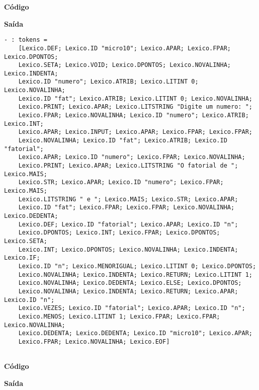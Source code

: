 \documentclass[hidelinks,12pt]{article}
\begin{document}
	
	{\large \textbf{Código} }
			
	
	{\large \textbf{Saída}}
	
	\begin{lstlisting}[caption=Analisador Léxico]
	- : tokens =
	[Lexico.DEF; Lexico.ID "micro10"; Lexico.APAR; Lexico.FPAR; Lexico.DPONTOS;
	Lexico.SETA; Lexico.VOID; Lexico.DPONTOS; Lexico.NOVALINHA; Lexico.INDENTA;
	Lexico.ID "numero"; Lexico.ATRIB; Lexico.LITINT 0; Lexico.NOVALINHA;
	Lexico.ID "fat"; Lexico.ATRIB; Lexico.LITINT 0; Lexico.NOVALINHA;
	Lexico.PRINT; Lexico.APAR; Lexico.LITSTRING "Digite um numero: ";
	Lexico.FPAR; Lexico.NOVALINHA; Lexico.ID "numero"; Lexico.ATRIB; Lexico.INT;
	Lexico.APAR; Lexico.INPUT; Lexico.APAR; Lexico.FPAR; Lexico.FPAR;
	Lexico.NOVALINHA; Lexico.ID "fat"; Lexico.ATRIB; Lexico.ID "fatorial";
	Lexico.APAR; Lexico.ID "numero"; Lexico.FPAR; Lexico.NOVALINHA;
	Lexico.PRINT; Lexico.APAR; Lexico.LITSTRING "O fatorial de "; Lexico.MAIS;
	Lexico.STR; Lexico.APAR; Lexico.ID "numero"; Lexico.FPAR; Lexico.MAIS;
	Lexico.LITSTRING " e "; Lexico.MAIS; Lexico.STR; Lexico.APAR;
	Lexico.ID "fat"; Lexico.FPAR; Lexico.FPAR; Lexico.NOVALINHA; Lexico.DEDENTA;
	Lexico.DEF; Lexico.ID "fatorial"; Lexico.APAR; Lexico.ID "n";
	Lexico.DPONTOS; Lexico.INT; Lexico.FPAR; Lexico.DPONTOS; Lexico.SETA;
	Lexico.INT; Lexico.DPONTOS; Lexico.NOVALINHA; Lexico.INDENTA; Lexico.IF;
	Lexico.ID "n"; Lexico.MENORIGUAL; Lexico.LITINT 0; Lexico.DPONTOS;
	Lexico.NOVALINHA; Lexico.INDENTA; Lexico.RETURN; Lexico.LITINT 1;
	Lexico.NOVALINHA; Lexico.DEDENTA; Lexico.ELSE; Lexico.DPONTOS;
	Lexico.NOVALINHA; Lexico.INDENTA; Lexico.RETURN; Lexico.APAR; Lexico.ID "n";
	Lexico.VEZES; Lexico.ID "fatorial"; Lexico.APAR; Lexico.ID "n";
	Lexico.MENOS; Lexico.LITINT 1; Lexico.FPAR; Lexico.FPAR; Lexico.NOVALINHA;
	Lexico.DEDENTA; Lexico.DEDENTA; Lexico.ID "micro10"; Lexico.APAR;
	Lexico.FPAR; Lexico.NOVALINHA; Lexico.EOF]
	
	\end{lstlisting}
	
	
	{\large \textbf{Código} }
			
	
	{\large \textbf{Saída}}
	
\end{document}
